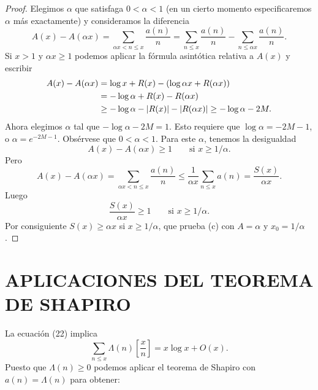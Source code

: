 \documentclass[12pt,a4paper]{book}
\begin{document}
\begin{proof}
        Elegimos $\alpha$ que satisfaga $0<\alpha<1$ (en un cierto momento
        especificaremos $\alpha$ más exactamente) y consideramos la diferencia
        \begin{equation*}
            A(x)-A(\alpha x)=\sum_{\alpha x<n\leq x}\frac{a(n)}{n}=\sum_{n\leq x}\frac{a(n)}{n}
            -\sum_{n\leq\alpha x}\frac{a(n)}{n}.
        \end{equation*}
        Si $x>1$ y $\alpha x\geq1$ podemos aplicar la fórmula asintótica relativa a
        $A(x)$ y escribir
        \begin{align*}
            A(x)-A(\alpha x)&=\log x+R(x)-(\log\alpha x+R(\alpha x))\\
            &=-\log\alpha+R(x)-R(\alpha x)\\
            &\geq-\log\alpha-\abs{R(x)}-\abs{R(\alpha x)}\geq-\log\alpha-2M.
        \end{align*}
        Ahora elegimos $\alpha$ tal que $-\log\alpha-2M=1$. Esto requiere que
        $\log\alpha=-2M-1$, o $\alpha=e^{-2M-1}$. Obsérvese que $0<\alpha<1$. Para
        este $\alpha$, tenemos la desigualdad
        \begin{equation*}
            A(x)-A(\alpha x)\geq1\qquad\text{si } x\geq1/\alpha.
        \end{equation*}
        Pero
        \begin{equation*}
            A(x)-A(\alpha x)=\sum_{\alpha x<n\leq x}\frac{a(n)}{n}\leq\frac{1}{\alpha x}\sum_{n\leq x}a(n)
            =\frac{S(x)}{\alpha x}.
        \end{equation*}
        Luego
        \begin{equation*}
            \frac{S(x)}{\alpha x}\geq1\qquad\text{si } x\geq1/\alpha.
        \end{equation*}
        Por consiguiente $S(x)\geq\alpha x$ si $x\geq1/\alpha$, que prueba (c) con
        $A=\alpha$ y $x_0=1/\alpha$.
    \end{proof}

    \section{APLICACIONES DEL TEOREMA DE SHAPIRO}

    La ecuación (22) implica
    \begin{equation*}
        \sum_{n\leq x}\Lambda(n)\left[\frac{x}{n}\right]=x\log x+O(x).
    \end{equation*}
    Puesto que $\Lambda(n)\geq0$ podemos aplicar el teorema de Shapiro con
    $a(n)=\Lambda(n)$ para obtener:
\end{document}
